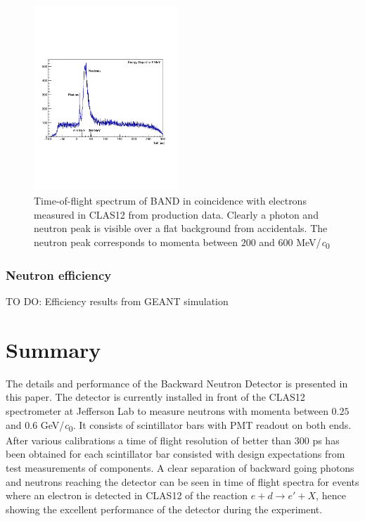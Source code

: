 \documentclass[3p,final,twocolumn]{elsarticle}
\begin{document}
\begin{figure}[h!]
	\centering
		\includegraphics[width=0.48\textwidth]{tof-labels.pdf}
	\caption{Time-of-flight spectrum of BAND in coincidence with electrons measured in CLAS12 from production data. Clearly a photon and neutron peak is visible over a flat background from accidentals. The neutron peak corresponds to momenta  between $200$ and $600$ \si{\MeV/\clight}}
	\label{fig:tof}
\end{figure}

\subsubsection{Neutron efficiency}
TO DO: Efficiency results from GEANT simulation




\section{Summary}
The details and performance of the Backward Neutron Detector is presented in this paper. The detector is currently installed in front of the CLAS12 spectrometer at Jefferson Lab to measure neutrons with momenta between $0.25$ and $0.6$ \si{\GeV/\clight}.  It consists of scintillator bars with PMT readout on both ends.
After various calibrations a time of flight resolution of better than 300 \si{\pico\s} has been obtained for each scintillator bar consisted with design expectations from test measurements of components. A clear separation of backward going photons and neutrons reaching the detector can be seen in time of flight spectra for events where an electron is detected in CLAS12 of the reaction $e+d \rightarrow e'+X$, hence showing the excellent performance of the detector during the experiment.
\end{document}
